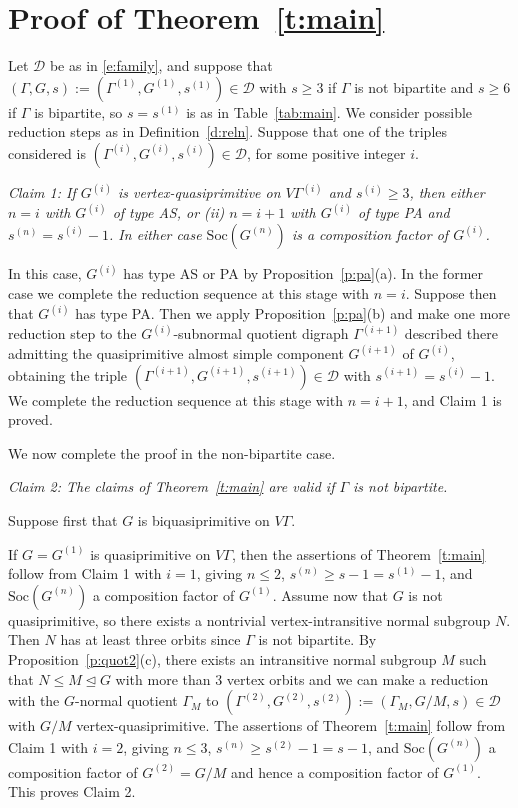\documentclass[11pt]{amsart}
\newcommand{\Soc}{\mathrm{Soc}}
\newcommand\DD{{\mathscr{D}}}
\begin{document}
  

\section{Proof of Theorem~\ref{t:main}}\label{proof of t:main}

Let $\DD$ be as in \eqref{e:family}, and suppose that  $(\Gamma, G, s):=(\Gamma^{(1)},G^{(1)},s^{(1)})\in\DD$ with $s\geqslant3$ if $\Gamma$ is not bipartite and $s\geqslant6$ if $\Gamma$ is bipartite, so $s=s^{(1)}$ is as in Table~\ref{tab:main}. We consider possible reduction steps as in Definition~\ref{d:reln}. Suppose that one of the triples considered is $(\Gamma^{(i)},G^{(i)},s^{(i)})\in\DD$, for some positive integer $i$.

\smallskip\noindent
\emph{Claim 1: If $G^{(i)}$ is vertex-quasiprimitive on  $V\Gamma^{(i)}$ and $s^{(i)}\geqslant3$, then either  $n=i$ with $G^{(i)}$ of type AS, or (ii) $n=i+1$ with $G^{(i)}$ of type PA and $s^{(n)} =s^{(i)}-1$. In either case $\Soc(G^{(n)})$ is a composition factor of $G^{(i)}$. }

In this case, $G^{(i)}$ has type AS or PA by Proposition~\ref{p:pa}(a). In the former case we complete the reduction sequence at this stage with $n=i$. Suppose then that $G^{(i)}$ has type PA. Then we apply Proposition~\ref{p:pa}(b) and make one more reduction step to the $G^{(i)}$-subnormal quotient digraph $\Gamma^{(i+1)}$ described there admitting the quasiprimitive almost simple component $G^{(i+1)}$ of $G^{(i)}$, obtaining the triple $(\Gamma^{(i+1)},G^{(i+1)},s^{(i+1)})\in\DD$ with  $s^{(i+1)}=s^{(i)}-1$. We complete the reduction sequence at this stage with $n=i+1$, and Claim 1 is proved.

\smallskip
We now complete the proof in the non-bipartite case.

\smallskip\noindent
\emph{Claim 2: The claims of Theorem~\ref{t:main} are valid if $\Gamma$ is not bipartite.} 

Suppose first that $G$ is biquasiprimitive on $V\Gamma$. 


If $G=G^{(1)}$ is quasiprimitive on $V\Gamma$, then the assertions of  Theorem~\ref{t:main} follow from Claim 1 with $i=1$, giving $n\leqslant 2$, $s^{(n)} \geqslant s-1= s^{(1)}-1$, and $\Soc(G^{(n)})$ a composition factor of $G^{(1)}$. Assume now that $G$ is not quasiprimitive, so there exists a nontrivial vertex-intransitive normal subgroup $N$. Then $N$ has at least three orbits since $\Gamma$ is not bipartite. By Proposition~\ref{p:quot2}(c), there exists an intransitive normal subgroup $M$ such that $N\leqslant M\unlhd G$ with more than 3 vertex orbits and we can make a reduction with the $G$-normal quotient $\Gamma_M$ to    $(\Gamma^{(2)},G^{(2)},s^{(2)}) := (\Gamma_M,G/M,s)\in\DD$ with $G/M$ vertex-quasiprimitive.  The assertions of  Theorem~\ref{t:main} follow from Claim 1 with $i=2$, giving $n\leqslant 3$, $s^{(n)} \geqslant s^{(2)}-1=s-1$, and $\Soc(G^{(n)})$ a composition factor of $G^{(2)}=G/M$ and hence a composition factor of $G^{(1)}$. This proves Claim 2.
\end{document}
